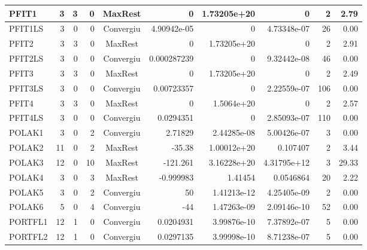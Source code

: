 \begin{center}
\begin{longtable}{|l|r|r|r|c|r|r|r|r|r|}
   PFIT1 &      3 &      3 &      0 & MaxRest    &           0 &    1.73205e+20 &           0 &      2 &    2.79 \\ \hline
 PFIT1LS &      3 &      0 &      0 & Convergiu  & 4.90942e-05 &              0 & 4.73348e-07 &     26 &    0.00 \\ \hline
   PFIT2 &      3 &      3 &      0 & MaxRest    &           0 &    1.73205e+20 &           0 &      2 &    2.91 \\ \hline
 PFIT2LS &      3 &      0 &      0 & Convergiu  & 0.000287239 &              0 & 9.32442e-08 &     46 &    0.00 \\ \hline
   PFIT3 &      3 &      3 &      0 & MaxRest    &           0 &    1.73205e+20 &           0 &      2 &    2.49 \\ \hline
 PFIT3LS &      3 &      0 &      0 & Convergiu  &  0.00723357 &              0 & 2.22559e-07 &    106 &    0.00 \\ \hline
   PFIT4 &      3 &      3 &      0 & MaxRest    &           0 &     1.5064e+20 &           0 &      2 &    2.57 \\ \hline
 PFIT4LS &      3 &      0 &      0 & Convergiu  &   0.0294351 &              0 & 2.85093e-07 &    110 &    0.00 \\ \hline
  POLAK1 &      3 &      0 &      2 & Convergiu  &     2.71829 &    2.44285e-08 & 5.00426e-07 &      3 &    0.00 \\ \hline
  POLAK2 &     11 &      0 &      2 & MaxRest    &      -35.38 &    1.00012e+20 &    0.107407 &      2 &    3.44 \\ \hline
  POLAK3 &     12 &      0 &     10 & MaxRest    &    -121.261 &    3.16228e+20 & 4.31795e+12 &      3 &   29.33 \\ \hline
  POLAK4 &      3 &      0 &      3 & MaxRest    &   -0.999983 &        1.41454 &   0.0546864 &     20 &    2.22 \\ \hline
  POLAK5 &      3 &      0 &      2 & Convergiu  &          50 &    1.41213e-12 & 4.25405e-09 &      2 &    0.00 \\ \hline
  POLAK6 &      5 &      0 &      4 & Convergiu  &         -44 &    1.47263e-09 & 2.09146e-10 &     52 &    0.00 \\ \hline
 PORTFL1 &     12 &      1 &      0 & Convergiu  &   0.0204931 &    3.99876e-10 & 7.37892e-07 &      5 &    0.00 \\ \hline
 PORTFL2 &     12 &      1 &      0 & Convergiu  &   0.0297135 &    3.99998e-10 & 8.71238e-07 &      5 &    0.00 \\ \hline

\end{longtable}
\end{center}
